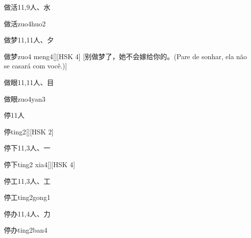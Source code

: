 \begin{entry}{做活}{11,9}{⼈、⽔}
  \begin{phonetics}{做活}{zuo4huo2}
  \end{phonetics}
\end{entry}

\begin{entry}{做梦}{11,11}{⼈、⼣}
  \begin{phonetics}{做梦}{zuo4 meng4}[][HSK 4]
    [别​做​梦​了​，她​不​会​嫁​给​你​的​。(Pare de sonhar, ela não se casará com você.)]
  \end{phonetics}
\end{entry}

\begin{entry}{做眼}{11,11}{⼈、⽬}
  \begin{phonetics}{做眼}{zuo4yan3}
  \end{phonetics}
\end{entry}

\begin{entry}{停}{11}{⼈}
  \begin{phonetics}{停}{ting2}[][HSK 2]
  \end{phonetics}
\end{entry}

\begin{entry}{停下}{11,3}{⼈、⼀}
  \begin{phonetics}{停下}{ting2 xia4}[][HSK 4]
  \end{phonetics}
\end{entry}

\begin{entry}{停工}{11,3}{⼈、⼯}
  \begin{phonetics}{停工}{ting2gong1}
  \end{phonetics}
\end{entry}

\begin{entry}{停办}{11,4}{⼈、⼒}
  \begin{phonetics}{停办}{ting2ban4}
  \end{phonetics}
\end{entry}

